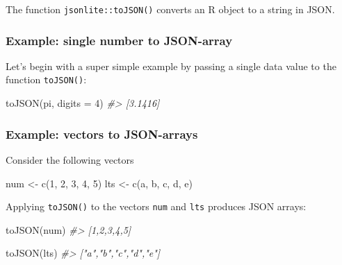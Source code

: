 \documentclass[
]{book}
\newenvironment{Shaded}{\begin{snugshade}}{\end{snugshade}}
\newcommand{\AttributeTok}[1]{\textcolor[rgb]{0.77,0.63,0.00}{#1}}
\newcommand{\CommentTok}[1]{\textcolor[rgb]{0.56,0.35,0.01}{\textit{#1}}}
\newcommand{\DecValTok}[1]{\textcolor[rgb]{0.00,0.00,0.81}{#1}}
\newcommand{\FunctionTok}[1]{\textcolor[rgb]{0.00,0.00,0.00}{#1}}
\newcommand{\NormalTok}[1]{#1}
\newcommand{\OtherTok}[1]{\textcolor[rgb]{0.56,0.35,0.01}{#1}}
\newcommand{\StringTok}[1]{\textcolor[rgb]{0.31,0.60,0.02}{#1}}
\begin{document}
The function \texttt{jsonlite::toJSON()} converts an R object to a string in JSON.

\hypertarget{example-single-number-to-json-array}{%
\subsubsection*{Example: single number to JSON-array}\label{example-single-number-to-json-array}}

Let's begin with a super simple example by passing a single data value to the
function \texttt{toJSON()}:

\begin{Shaded}
\begin{Highlighting}[]
\FunctionTok{toJSON}\NormalTok{(pi, }\AttributeTok{digits =} \DecValTok{4}\NormalTok{)}
\CommentTok{\#\textgreater{} [3.1416]}
\end{Highlighting}
\end{Shaded}

\hypertarget{example-vectors-to-json-arrays}{%
\subsubsection*{Example: vectors to JSON-arrays}\label{example-vectors-to-json-arrays}}

Consider the following vectors

\begin{Shaded}
\begin{Highlighting}[]
\NormalTok{num }\OtherTok{\textless{}{-}} \FunctionTok{c}\NormalTok{(}\DecValTok{1}\NormalTok{, }\DecValTok{2}\NormalTok{, }\DecValTok{3}\NormalTok{, }\DecValTok{4}\NormalTok{, }\DecValTok{5}\NormalTok{)}
\NormalTok{lts }\OtherTok{\textless{}{-}} \FunctionTok{c}\NormalTok{(}\StringTok{\textquotesingle{}a\textquotesingle{}}\NormalTok{, }\StringTok{\textquotesingle{}b\textquotesingle{}}\NormalTok{, }\StringTok{\textquotesingle{}c\textquotesingle{}}\NormalTok{, }\StringTok{\textquotesingle{}d\textquotesingle{}}\NormalTok{, }\StringTok{\textquotesingle{}e\textquotesingle{}}\NormalTok{)}
\end{Highlighting}
\end{Shaded}

Applying \texttt{toJSON()} to the vectors \texttt{num} and \texttt{lts} produces JSON arrays:

\begin{Shaded}
\begin{Highlighting}[]
\FunctionTok{toJSON}\NormalTok{(num)}
\CommentTok{\#\textgreater{} [1,2,3,4,5]}

\FunctionTok{toJSON}\NormalTok{(lts)}
\CommentTok{\#\textgreater{} ["a","b","c","d","e"]}
\end{Highlighting}
\end{Shaded}
\end{document}
